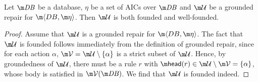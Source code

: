 \begin{proposition}
  \label{prop:founded}
  Let $\db$ be a database, $\eta$ be a set of AICs over $\db$ and $\UU$ be a grounded repair for $\fulldb$.
  Then $\UU$ is both founded and well-founded.
\end{proposition}
\begin{proof}
  Assume that $\UU$ is a grounded repair for $\fulldb$.
  The fact that $\UU$ is founded follows immediately from the definition of grounded repair, since for each action $\alpha$, $\VV=\UU\setminus\{\alpha\}$ is a strict subset of $\UU$. Hence, by groundedness of $\UU$, there must be a rule $r$ with $\head(r)\in \UU\setminus \VV=\{\alpha\}$, whose body is satisfied in $\VV(\db)$. We find that $\UU$ is founded indeed. %
  

\end{proof}
